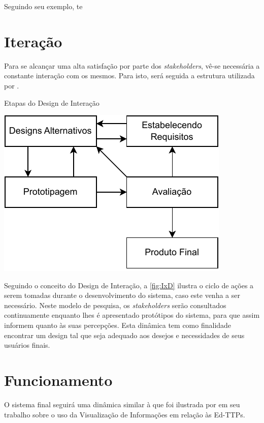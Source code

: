 Seguindo seu exemplo, te

\section{Iteração}

Para se alcançar uma alta satisfação por parte dos \textit{stakeholders}, vê-se necessária a constante interação com os mesmos. Para isto, será seguida a estrutura utilizada por .

\begin{MyCenteredFigure}
  \caption{Etapas do Design de Interação}
  \label{fig:IxD}
  \includegraphics{files/img/Arquitetura/Arquitetura-IxD.drawio}
\end{MyCenteredFigure}    %

Seguindo o conceito do Design de Interação, a \autoref{fig:IxD} ilustra o ciclo de ações a serem tomadas durante o desenvolvimento do sistema, caso este venha a ser necessário. Neste modelo de pesquisa, os \textit{stakeholders} serão consultados continuamente enquanto lhes é apresentado protótipos do sistema, para que assim informem quanto às suas percepções. Esta dinâmica tem como finalidade encontrar um design tal que seja adequado aos desejos e necessidades de seus usuários finais.

\section{Funcionamento}

O sistema final seguirá uma dinâmica similar à que foi ilustrada por  em seu trabalho sobre o uso da Visualização de Informações em relação às Ed-TTPs.

